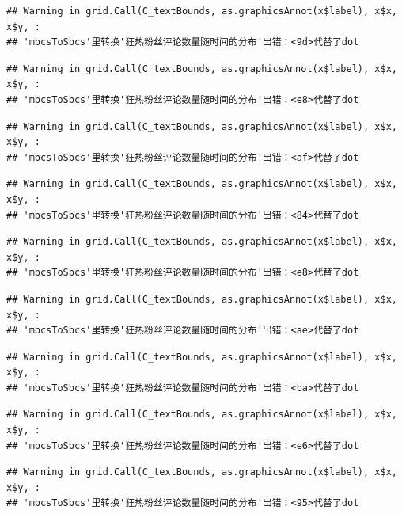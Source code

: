\documentclass[
]{article}
\begin{document}
\begin{verbatim}
## Warning in grid.Call(C_textBounds, as.graphicsAnnot(x$label), x$x, x$y, :
## 'mbcsToSbcs'里转换'狂热粉丝评论数量随时间的分布'出错：<9d>代替了dot
\end{verbatim}

\begin{verbatim}
## Warning in grid.Call(C_textBounds, as.graphicsAnnot(x$label), x$x, x$y, :
## 'mbcsToSbcs'里转换'狂热粉丝评论数量随时间的分布'出错：<e8>代替了dot
\end{verbatim}

\begin{verbatim}
## Warning in grid.Call(C_textBounds, as.graphicsAnnot(x$label), x$x, x$y, :
## 'mbcsToSbcs'里转换'狂热粉丝评论数量随时间的分布'出错：<af>代替了dot
\end{verbatim}

\begin{verbatim}
## Warning in grid.Call(C_textBounds, as.graphicsAnnot(x$label), x$x, x$y, :
## 'mbcsToSbcs'里转换'狂热粉丝评论数量随时间的分布'出错：<84>代替了dot
\end{verbatim}

\begin{verbatim}
## Warning in grid.Call(C_textBounds, as.graphicsAnnot(x$label), x$x, x$y, :
## 'mbcsToSbcs'里转换'狂热粉丝评论数量随时间的分布'出错：<e8>代替了dot
\end{verbatim}

\begin{verbatim}
## Warning in grid.Call(C_textBounds, as.graphicsAnnot(x$label), x$x, x$y, :
## 'mbcsToSbcs'里转换'狂热粉丝评论数量随时间的分布'出错：<ae>代替了dot
\end{verbatim}

\begin{verbatim}
## Warning in grid.Call(C_textBounds, as.graphicsAnnot(x$label), x$x, x$y, :
## 'mbcsToSbcs'里转换'狂热粉丝评论数量随时间的分布'出错：<ba>代替了dot
\end{verbatim}

\begin{verbatim}
## Warning in grid.Call(C_textBounds, as.graphicsAnnot(x$label), x$x, x$y, :
## 'mbcsToSbcs'里转换'狂热粉丝评论数量随时间的分布'出错：<e6>代替了dot
\end{verbatim}

\begin{verbatim}
## Warning in grid.Call(C_textBounds, as.graphicsAnnot(x$label), x$x, x$y, :
## 'mbcsToSbcs'里转换'狂热粉丝评论数量随时间的分布'出错：<95>代替了dot
\end{verbatim}
\end{document}
